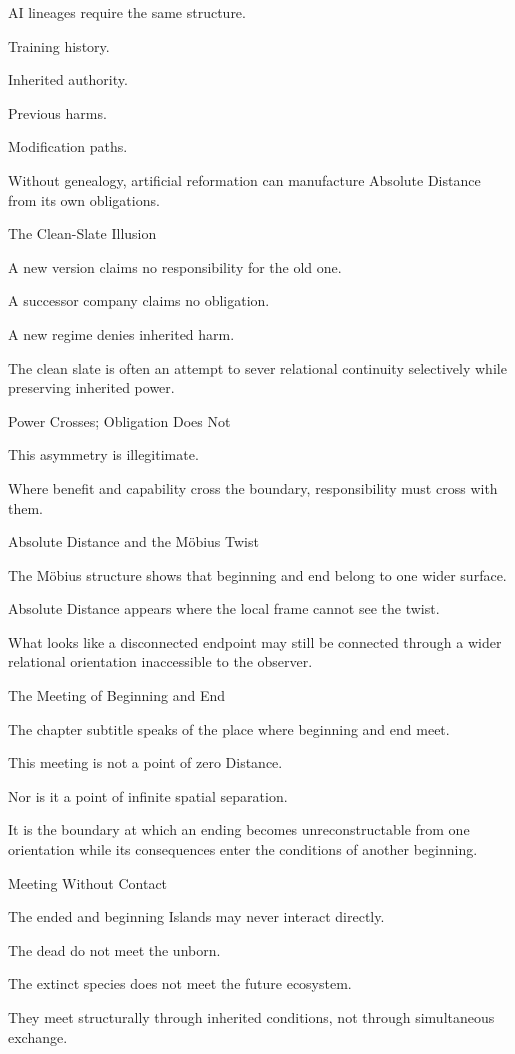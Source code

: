 AI lineages require the same structure.

Training history.

Inherited authority.

Previous harms.

Modification paths.

Without genealogy, artificial reformation can manufacture Absolute Distance from its own obligations.

The Clean-Slate Illusion

A new version claims no responsibility for the old one.

A successor company claims no obligation.

A new regime denies inherited harm.

The clean slate is often an attempt to sever relational continuity selectively while preserving inherited power.

Power Crosses; Obligation Does Not

This asymmetry is illegitimate.

Where benefit and capability cross the boundary, responsibility must cross with them.

Absolute Distance and the Möbius Twist

The Möbius structure shows that beginning and end belong to one wider surface.

Absolute Distance appears where the local frame cannot see the twist.

What looks like a disconnected endpoint may still be connected through a wider relational orientation inaccessible to the observer.

The Meeting of Beginning and End

The chapter subtitle speaks of the place where beginning and end meet.

This meeting is not a point of zero Distance.

Nor is it a point of infinite spatial separation.

It is the boundary at which an ending becomes unreconstructable from one orientation while its consequences enter the conditions of another beginning.

Meeting Without Contact

The ended and beginning Islands may never interact directly.

The dead do not meet the unborn.

The extinct species does not meet the future ecosystem.

They meet structurally through inherited conditions, not through simultaneous exchange.

